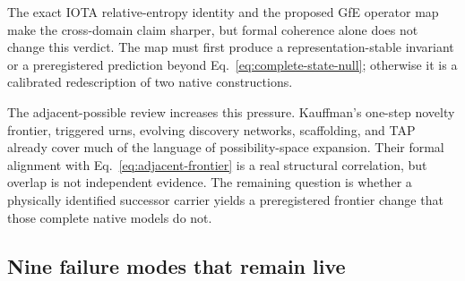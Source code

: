 The exact IOTA relative-entropy identity and the proposed GfE operator map make
the cross-domain claim sharper, but formal coherence alone does not change this
verdict. The map must first produce a representation-stable invariant or a
preregistered prediction beyond Eq.~\eqref{eq:complete-state-null}; otherwise it
is a calibrated redescription of two native constructions.

The adjacent-possible review increases this pressure. Kauffman's one-step
novelty frontier, triggered urns, evolving discovery networks, scaffolding, and
TAP already cover much of the language of possibility-space expansion. Their
formal alignment with Eq.~\eqref{eq:adjacent-frontier} is a real structural
correlation, but overlap is not independent evidence. The remaining question is
whether a physically identified successor carrier yields a preregistered
frontier change that those complete native models do not.

\subsection{Nine failure modes that remain live}

